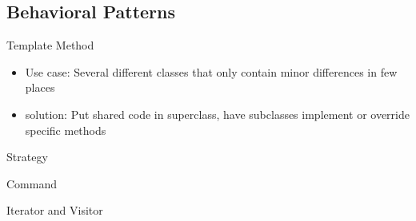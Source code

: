 \subsection{Behavioral Patterns}

\begin{frame}{Template Method}
	\begin{itemize}
		\item Use case: Several different classes that only contain minor differences in few places
		\item {} solution: Put shared code in superclass, have subclasses implement or override specific methods
	\end{itemize}
\end{frame}

\begin{frame}{Strategy}
		
\end{frame}

\begin{frame}{Command}
	
\end{frame}

\begin{frame}{Iterator and Visitor}
	
\end{frame}